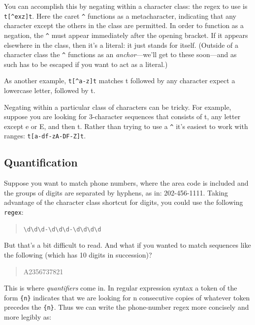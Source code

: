 \documentclass[]{book}
\theoremstyle{definition}
\theoremstyle{definition}
\theoremstyle{definition}
\theoremstyle{remark}
\begin{document}
{You can accomplish this by negating within a character class: the regex
to use is \texttt{t{[}\^{}exz{]}t}. Here the caret \texttt{\^{}}
functions as a metacharacter, indicating that any character except the
others in the class are permitted. In order to function as a negation,
the \texttt{\^{}} must appear immediately after the opening bracket. If
it appears elsewhere in the class, then it's a literal: it just stands
for itself. (Outside of a character class the \texttt{\^{}} functions as
an \emph{anchor}---we'll get to these soon---and as such has to be
escaped if you want to act as a literal.)

As another example, \texttt{t{[}\^{}a-z{]}t} matches t followed by any
character expect a lowercase letter, followed by t.

Negating within a particular class of characters can be tricky. For
example, suppose you are looking for 3-character sequences that consists
of t, any letter except e or E, and then t. Rather than trying to use a
\texttt{\^{}} it's easiest to work with ranges:
\texttt{t{[}a-df-zA-DF-Z{]}t}.

\subsection{Quantification}\label{quantification}

Suppose you want to match phone numbers, where the area code is included
and the groups of digits are separated by hyphens, as in: 202-456-1111.
Taking advantage of the character class shortcut for digits, you could
use the following \texttt{regex}:

\begin{quote}
\texttt{\textbackslash{}d\textbackslash{}d\textbackslash{}d-\textbackslash{}d\textbackslash{}d\textbackslash{}d-\textbackslash{}d\textbackslash{}d\textbackslash{}d\textbackslash{}d}
\end{quote}

But that's a bit difficult to read. And what if you wanted to match
sequences like the following (which has 10 digits in succession)?

\begin{quote}
A2356737821
\end{quote}

This is where \emph{quantifiers}  come in. In regular
expression syntax a token of the form \texttt{\{n\}} indicates that we
are looking for n consecutive copies of whatever token precedes the
\texttt{\{n\}}. Thus we can write the phone-number regex more concisely
and more legibly as:

}
\end{document}
